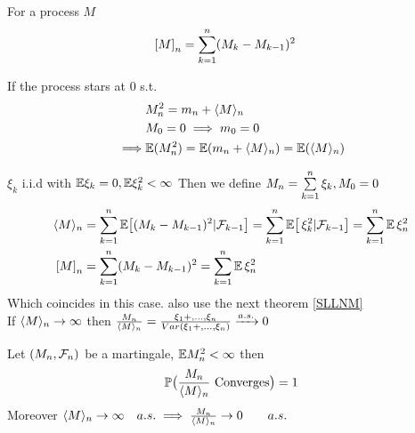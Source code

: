 \begin{dfn} For a process $M$
\begin{align*}
    \left[{M} \right]_n  &= \sum\limits_{k=1}^n (M_k -M_{k-1})^2
\end{align*}
\end{dfn}

\begin{rem}If the process stars at $0$ s.t.
\begin{align*}
    &M_n^2 = m_n + \langle{M} \rangle_n \\
    &M_0 = 0 \implies m_0 = 0 \\
    \implies& \mathbb{E}(M_n^2) = \mathbb{E}(m_n + \langle{M} \rangle_n) = \mathbb{E}(\langle{M} \rangle_n)
\end{align*}
\end{rem}

\vfill
\begin{example}
$\xi_k$ i.i.d with $\mathbb{E}\xi_k = 0, \mathbb{E}\xi_k^2 <\infty$ Then we define $M_n = \sum\limits_{k=1}^n \xi_k, M_0 = 0$
\begin{align*}
    \langle{M} \rangle_n &= \sum\limits_{k=1}^n \mathbb{E}\big[(M_k - M_{k-1})^2| \mathcal{F}_{k-1}\big] = \sum\limits_{k=1}^n \mathbb{E}\big[\,\xi_k^2| \mathcal{F}_{k-1}\big] =\sum\limits_{k=1}^n \mathbb{E} \,\xi_n^2 \\
    \left[{M} \right]_n  &= \sum\limits_{k=1}^n (M_k -M_{k-1})^2 = \sum\limits_{k=1}^n \mathbb{E} \,\xi_n^2
\end{align*} Which coincides in this case. also use the next theorem \ref{SLLNM} \\
If $\langle{M} \rangle_n \rightarrow \infty$ then $\frac{M_n}{\langle{M} \rangle_n}  = \frac{\xi_1 + ,..., \xi_n}{Var(\xi_1 + ,..., \xi_n)}\xrightarrow{a.s.} 0$
\end{example}

\newpage
\begin{thm}
\label{SLLNM}
Let $(M_n, \mathcal{F}_n)$ be a martingale, $\mathbb{E} M_n^2<\infty$ then \begin{equation*}
    \mathbb{P}\big(\frac{M_n}{\langle{M} \rangle_n} \text{ Converges}\big) = 1
\end{equation*}Moreover $\langle{M} \rangle_n \rightarrow \infty \quad a.s. \implies \frac{M_n}{\langle{M} \rangle_n} \rightarrow 0 \qquad a.s.$
\end{thm}